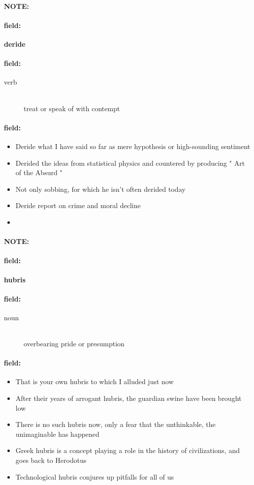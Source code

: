 \documentclass[12pt]{article}
\newenvironment{note}{\paragraph{NOTE:}}{}
\newenvironment{field}{\paragraph{field:}}{}
\begin{document}
\begin{note}
\begin{field}
\textbf{\large deride}
\end{field}


\begin{field}
\begin{description}
\item[verb] \hfill \\ 
treat or speak of with contempt

\end{description}
\end{field}

\begin{field}
\begin{itemize}
\item Deride what I have said so far as mere hypothesis or high-sounding sentiment
\item Derided the ideas from statistical physics and countered by producing " Art of the Absurd " 
\item Not only sobbing, for which he isn't often derided today
\item Deride report on crime and moral decline 
\item 
\end{itemize}
\end{field}
\end{note}
\begin{note}
\begin{field}
\textbf{\large hubris}
\end{field}


\begin{field}
\begin{description}
\item[noun] \hfill \\ 
overbearing pride or presumption

\end{description}
\end{field}

\begin{field}
\begin{itemize}
\item That is your own hubris to which I alluded just now
\item After their years of arrogant hubris, the guardian swine have been brought low
\item There is no such hubris now, only a fear that the unthinkable, the unimaginable has happened
\item Greek hubris is a concept playing a role in the history of civilizations, and goes back to Herodotus
\item Technological hubris conjures up pitfalls for all of us
\end{itemize}
\end{field}
\end{note}
\end{document}
